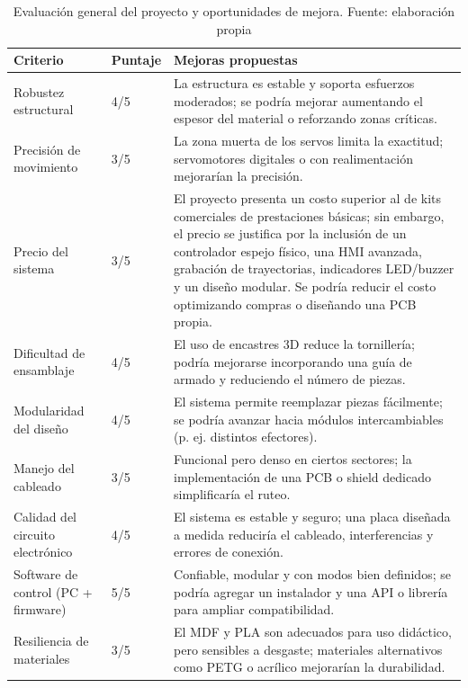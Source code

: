 \begin{table}[H]
\centering
\caption{Evaluación general del proyecto y oportunidades de mejora. Fuente: elaboración propia}\label{tab:evaluacion_proyecto}
\begin{tabular}{p{} p{} p{}}
\toprule
\textbf{Criterio} & \textbf{Puntaje} & \textbf{Mejoras propuestas} \\
\midrule

Robustez estructural & 4/5 &
La estructura es estable y soporta esfuerzos moderados; se podría mejorar aumentando el espesor del material o reforzando zonas críticas. \\

Precisión de movimiento & 3/5 &
La zona muerta de los servos limita la exactitud; servomotores digitales o con realimentación mejorarían la precisión. \\

Precio del sistema & 3/5 &
El proyecto presenta un costo superior al de kits comerciales de prestaciones básicas; sin embargo, el precio se justifica por la inclusión de un controlador espejo físico, una HMI avanzada, grabación de trayectorias, indicadores LED/buzzer y un diseño modular. Se podría reducir el costo optimizando compras o diseñando una PCB propia. \\

Dificultad de ensamblaje & 4/5 &
El uso de encastres 3D reduce la tornillería; podría mejorarse incorporando una guía de armado y reduciendo el número de piezas. \\

Modularidad del diseño & 4/5 &
El sistema permite reemplazar piezas fácilmente; se podría avanzar hacia módulos intercambiables (p. ej. distintos efectores). \\

Manejo del cableado & 3/5 &
Funcional pero denso en ciertos sectores; la implementación de una PCB o shield dedicado simplificaría el ruteo. \\

Calidad del circuito electrónico & 4/5 &
El sistema es estable y seguro; una placa diseñada a medida reduciría el cableado, interferencias y errores de conexión. \\

Software de control (PC + firmware) & 5/5 &
Confiable, modular y con modos bien definidos; se podría agregar un instalador y una API o librería para ampliar compatibilidad. \\

Resiliencia de materiales & 3/5 &
El MDF y PLA son adecuados para uso didáctico, pero sensibles a desgaste; materiales alternativos como PETG o acrílico mejorarían la durabilidad. \\
\bottomrule
\end{tabular}
\end{table}


